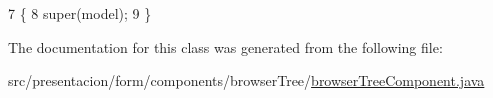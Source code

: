 \begin{DoxyCode}
7                                                               \{
8         super(model);
9     \}
\end{DoxyCode}


The documentation for this class was generated from the following file\+:\begin{DoxyCompactItemize}
\item 
src/presentacion/form/components/browser\+Tree/\hyperlink{browserTreeComponent_8java}{browser\+Tree\+Component.\+java}\end{DoxyCompactItemize}
